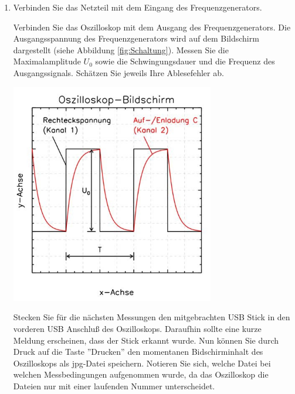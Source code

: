 \begin{enumerate}
 \item Verbinden Sie das Netzteil mit dem Eingang des Frequenzgenerators. \\
	\begin{minipage}{0.45\textwidth}
		Verbinden Sie das Oszilloskop mit dem Ausgang des Frequenzgenerators. Die Ausgangsspannung des Frequenzgenerators wird auf dem Bildschirm dargestellt (siehe Abbildung \ref{fig:Schaltung}). Messen Sie die Maximalamplitude 
		$U_0$ sowie die Schwingungsdauer und die Frequenz des Ausgangssignals. Schätzen Sie jeweils Ihre Ablesefehler ab.
	\end{minipage} 
	\hfill
	\begin{minipage}{0.45\textwidth}
		\raggedright
			\includegraphics[width=0.7\textwidth]{Abbildungen/Oszi.jpg}
			\label{fig:Oszi}
	\end{minipage}
\begin{hint}
	Stecken Sie für die nächsten Messungen den mitgebrachten USB Stick in den vorderen USB Anschluß des Oszilloskops. Daraufhin sollte eine kurze Meldung erscheinen, dass der Stick erkannt wurde. Nun können Sie durch Druck auf die Taste ''Drucken'' den momentanen Bidschirminhalt des Oszilloskops als jpg-Datei speichern. Notieren Sie sich, welche Datei bei welchen Messbedingungen aufgenommen wurde, da das Oszilloskop die Dateien nur mit einer laufenden Nummer unterscheidet.
\end{hint}


\end{enumerate}
